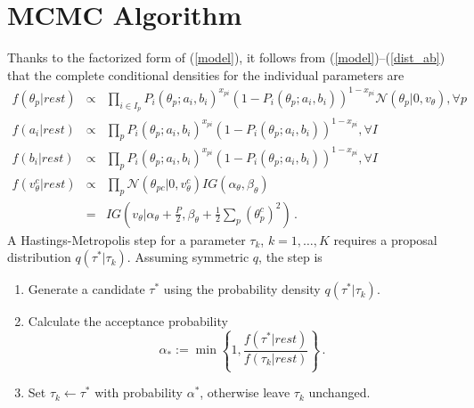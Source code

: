 \documentclass{article}
\newcommand{\Normal}{\mathcal{N}}
\newcommand{\st}{v_{\ta}}
\newcommand{\ta}{\theta}
\begin{document}
\section{MCMC Algorithm}
Thanks to the factorized form of (\ref{model}), it follows from (\ref{model})--(\ref{dist_ab}) that the complete conditional densities for the individual parameters are
\begin{eqnarray}
  f(\ta_p|rest) &\propto& \prod_{i \in I_p} 
  P_i(\ta_p;a_i,b_i)^{x_{pi}} 
  \left(1 - P_i(\ta_p;a_i,b_i)\right)^{1-x_{pi}} 
  \Normal(\ta_p|0,\st),\forall p\,
  \label{cond_ta}
  \\
  f(a_i|rest) &\propto& \prod_{p} 
  P_i(\ta_p;a_i,b_i)^{x_{pi}} 
  \left(1 - P_i(\ta_p;a_i,b_i)\right)^{1-x_{pi}},\forall I\,
  \label{cond_a}
  \\
  f(b_i|rest) &\propto& \prod_{p} 
  P_i(\ta_p;a_i,b_i)^{x_{pi}} 
  \left(1 - P_i(\ta_p;a_i,b_i)\right)^{1-x_{pi}},\forall I\,
  \label{cond_b}
  \\
  f(\st^c|rest) &\propto& \prod_{p} 
  \Normal(\ta_{pc}|0,\st^c) IG(\alpha_{\ta},\beta_{\ta}) \\
  &=& IG\left(\st|\alpha_{\ta} + \frac{P}{2}, \beta_{\ta} + \frac12 \sum_p (\ta_p^c)^2\right)\,.
  \label{cond_st}
\end{eqnarray}
A Hastings-Metropolis step for a parameter $\tau_k$, $k=1,\dots,K$ requires a proposal distribution $q(\tau^*|\tau_k)$. Assuming symmetric $q$, the step is
\begin{enumerate}
	\item Generate a candidate $\tau^*$ using the probability density $q(\tau^*|\tau_k)$.
	\item Calculate the acceptance probability
	\begin{equation}
		\alpha_* := \min\left\{1, \frac{f(\tau^*|rest)}{f(\tau_k|rest)} \right\}\,.
	\end{equation}
	\item Set $\tau_k \leftarrow \tau^*$ with probability $\alpha^*$, otherwise leave $\tau_k$ unchanged.
\end{enumerate}
\end{document}

